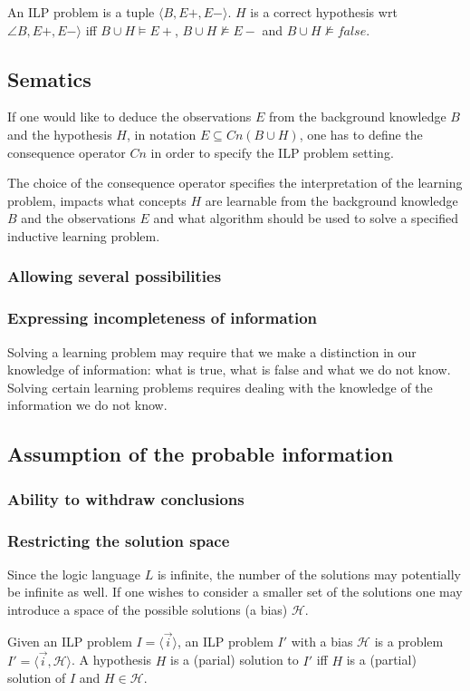 \begin{defn}
An ILP problem is a tuple $\langle B, E+, E- \rangle$. $H$ is a correct hypothesis wrt $\angle B, E+, E- \rangle$ iff
$B \cup H \models E+$, $B \cup H \not\models E-$ and $B \cup H \not\models false$.
\end{defn}

\subsection{Sematics}\label{problems_in_ilp_semantics}
If one would like to deduce the observations $E$ from the background knowledge $B$ and the hypothesis $H$, in notation $E \subseteq Cn(B \cup H)$, one has to define the consequence operator $Cn$ in order to specify the ILP problem setting.

The choice of the consequence operator specifies the interpretation of the learning problem, impacts what concepts $H$ are learnable from the background knowledge $B$ and the observations $E$ and what algorithm should be used to solve a specified inductive learning problem.

\subsubsection{Allowing several possibilities}


\subsubsection{Expressing incompleteness of information}
Solving a learning problem may require that we make a distinction in our knowledge of information: what is true, what is false and what we do not know.
Solving certain learning problems requires dealing with the knowledge of the information we do not know.

\subsection{Assumption of the probable information}

\subsubsection{Ability to withdraw conclusions}

\subsubsection{Restricting the solution space}
Since the logic language $L$ is infinite, the number of the solutions may potentially be infinite as well. If one wishes to consider a smaller set of the solutions one may introduce a space of the possible solutions (a bias) $\mathcal{H}$.
\begin{defn}
Given an ILP problem $I=\langle \overrightarrow{i} \rangle$,
an ILP problem $I'$ with a bias $\mathcal{H}$ is a problem
$I'=\langle \overrightarrow{i}, \mathcal{H} \rangle$.
A hypothesis $H$ is a (parial) solution to $I'$ iff $H$ is a (partial) solution of $I$ and $H \in \mathcal{H}$.
\end{defn}

